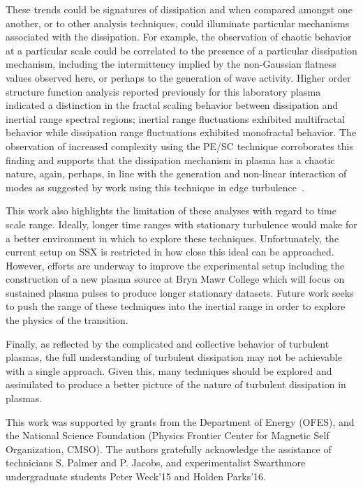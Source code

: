 \documentclass[aip,pop,amsmath,amssymb,preprint,superscriptaddress]{revtex4-1} %
\begin{document}
These trends could be signatures of dissipation and when compared amongst one another, or to other analysis techniques, could illuminate particular mechanisms associated with the dissipation. For example, the observation of chaotic behavior at a particular scale could be correlated to the presence of a particular dissipation mechanism, including the intermittency implied by the non-Gaussian flatness values observed here, or perhaps to the generation of wave activity. Higher order structure function analysis reported previously for this laboratory plasma~\cite{schaffner2015} indicated a distinction in the fractal scaling behavior between dissipation and inertial range spectral regions; inertial range fluctuations exhibited multifractal behavior while dissipation range fluctuations exhibited monofractal behavior. The observation of increased complexity using the PE/SC technique corroborates this finding and supports that the dissipation mechanism in plasma has a chaotic nature, again, perhaps, in line with the generation and non-linear interaction of modes as suggested by work using this technique in edge turbulence~\cite{maggs2013}.

This work also highlights the limitation of these analyses with regard to time scale range. Ideally, longer time ranges with stationary turbulence would make for a better environment in which to explore these techniques. Unfortunately, the current setup on SSX is restricted in how close this ideal can be approached. However, efforts are underway to improve the experimental setup including the construction of a new plasma source at Bryn Mawr College which will focus on sustained plasma pulses to produce longer stationary datasets. Future work seeks to push the range of these techniques into the inertial range in order to explore the physics of the transition.

Finally, as reflected by the complicated and collective behavior of turbulent plasmas, the full understanding of turbulent dissipation may not be achievable with a single approach. Given this, many techniques should be explored and assimilated to produce a better picture of the nature of turbulent dissipation in plasmas.

\acknowledgements

This work was supported by grants from the Department
of Energy (OFES), and the National Science Foundation
(Physics Frontier Center for Magnetic Self Organization,
CMSO). The authors gratefully acknowledge the assistance of technicians
S. Palmer and P. Jacobs, and experimentalist Swarthmore undergraduate students Peter Weck'15 and Holden Parks'16.
\end{document}
